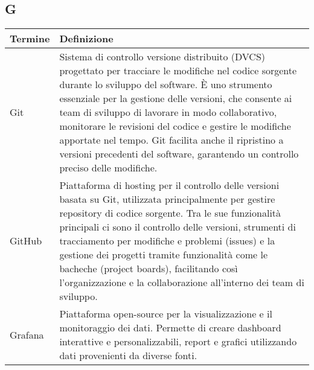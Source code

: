 \documentclass[10pt]{article}
\begin{document}
\subsection{G} %
\begin{longtable}{|>{\centering\arraybackslash}m{2.5cm}|>{\arraybackslash}m{12.5cm}|}
\hline
\rowcolor[gray]{0.8}
\textbf{Termine} & \textbf{Definizione}\\
\endhead
\hline
Git & Sistema di controllo versione distribuito (DVCS) progettato per tracciare le modifiche nel codice sorgente durante lo sviluppo del software. È uno strumento essenziale per la gestione delle versioni, che consente ai team di sviluppo di lavorare in modo collaborativo, monitorare le revisioni del codice e gestire le modifiche apportate nel tempo. Git facilita anche il ripristino a versioni precedenti del software, garantendo un controllo preciso delle modifiche.\\
\hline
GitHub & Piattaforma di hosting per il controllo delle versioni basata su Git, utilizzata principalmente per gestire repository di codice sorgente. Tra le sue funzionalità principali ci sono il controllo delle versioni, strumenti di tracciamento per modifiche e problemi (issues) e la gestione dei progetti tramite funzionalità come le bacheche (project boards), facilitando così l'organizzazione e la collaborazione all'interno dei team di sviluppo.\\
\hline
Grafana & Piattaforma open-source per la visualizzazione e il monitoraggio dei dati. Permette di creare dashboard interattive e personalizzabili, report e grafici utilizzando dati provenienti da diverse fonti.\\
\hline
\end{longtable}

\end{document}

